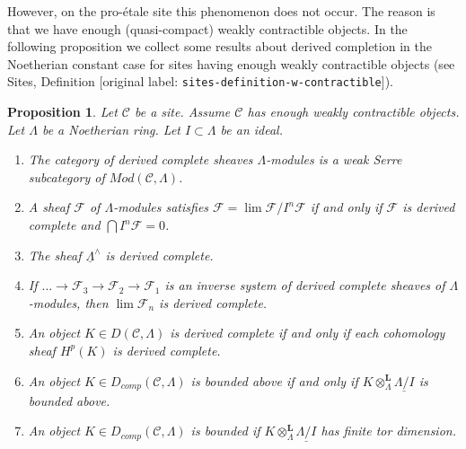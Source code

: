 \documentclass[10pt,a4paper]{article}
\theoremstyle{plain}
\newtheorem{proposition}[subsection]{Proposition}
\theoremstyle{definition}
\theoremstyle{remark}
\numberwithin{equation}{subsection}
\def\lim{\mathop{\mathrm{lim}}\nolimits}
\begin{document}
\medskip\noindent
However, on the pro-\'etale site this phenomenon does not occur.
The reason is that we have enough (quasi-compact) weakly contractible objects.
In the following proposition we collect some results about derived
completion in the Noetherian constant case for sites having enough
weakly contractible objects (see
Sites, Definition \textnormal{[original label: \nolinkurl{sites-definition-w-contractible}]}).

\begin{proposition}
\label{proposition-enough-weakly-contractibles}
Let $\mathcal{C}$ be a site. Assume $\mathcal{C}$ has enough
weakly contractible objects.
Let $\Lambda$ be a Noetherian ring. Let $I \subset \Lambda$ be an ideal.
\begin{enumerate}
\item The category of derived complete sheaves $\Lambda$-modules is a
weak Serre subcategory of $\textit{Mod}(\mathcal{C}, \Lambda)$.
\item A sheaf $\mathcal{F}$ of $\Lambda$-modules satisfies
$\mathcal{F} = \lim \mathcal{F}/I^n\mathcal{F}$ if and only if
$\mathcal{F}$ is derived complete and $\bigcap I^n\mathcal{F} = 0$.
\item The sheaf $\underline{\Lambda}^\wedge$ is derived complete.
\item If $\ldots \to \mathcal{F}_3 \to \mathcal{F}_2 \to \mathcal{F}_1$
is an inverse system of derived complete sheaves of $\Lambda$-modules,
then $\lim \mathcal{F}_n$ is derived complete.
\item An object $K \in D(\mathcal{C}, \Lambda)$ is derived complete if
and only if each cohomology sheaf $H^p(K)$ is derived complete.
\item An object $K \in D_{comp}(\mathcal{C}, \Lambda)$ is bounded above
if and only if $K \otimes_\Lambda^\mathbf{L} \underline{\Lambda/I}$
is bounded above.
\item An object $K \in D_{comp}(\mathcal{C}, \Lambda)$ is bounded
if $K \otimes_\Lambda^\mathbf{L} \underline{\Lambda/I}$ has finite
tor dimension.
\end{enumerate}
\end{proposition}
\end{document}
